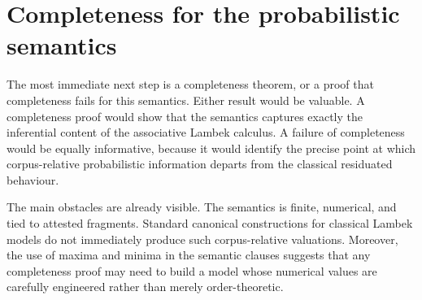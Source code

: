 \section{Completeness for the probabilistic semantics}
The most immediate next step is a completeness theorem, or a proof that completeness fails for
this semantics. Either result would be valuable. A completeness proof would show that the
semantics captures exactly the inferential content of the associative Lambek calculus. A failure
of completeness would be equally informative, because it would identify the precise point at
which corpus-relative probabilistic information departs from the classical residuated behaviour.

The main obstacles are already visible. The semantics is finite, numerical, and tied to attested
fragments. Standard canonical constructions for classical Lambek models do not immediately
produce such corpus-relative valuations. Moreover, the use of maxima and minima in the
semantic clauses suggests that any completeness proof may need to build a model whose
numerical values are carefully engineered rather than merely order-theoretic.

